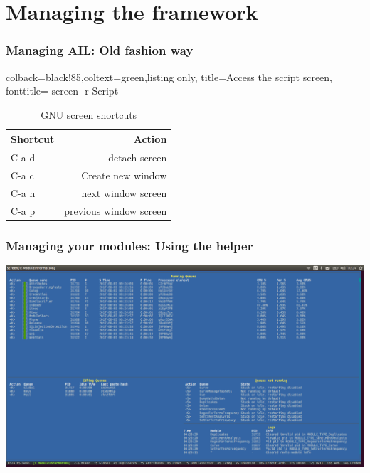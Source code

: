 \section{Managing the framework}
\begin{frame}[fragile]
    \frametitle{Managing AIL: Old fashion way}
    \lstset{style=bash}
    \begin{tcblisting}{colback=black!85,coltext=green,listing only,
        title=Access the script screen, fonttitle=\bfseries}
screen -r Script
\end{tcblisting}
\begin{table}
        \caption{GNU screen shortcuts}
    \begin{tabular}{lr}
        \toprule
        Shortcut & Action \\
        \midrule
        C-a d & detach screen \\
        \midrule
        C-a c & Create new window \\
        \midrule
        C-a n & next window screen \\
        \midrule
        C-a p & previous window screen \\
        \bottomrule
    \end{tabular}
\end{table}
\end{frame}


\begin{frame}[fragile]
    \frametitle{Managing your modules: Using the helper}
    \centerline{\includegraphics[scale=0.22]{images/moduleManager.png}}
\end{frame}

